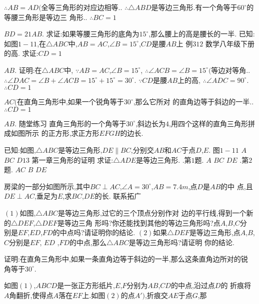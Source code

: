 \documentclass[cn,blue,12pt]{elegantbook}
\begin{document}
\begin{liti}[resume]
\( \therefore AB = AD( \)全等三角形的对应边相等.. 
\( \therefore \triangle ABD \)是等边三角形.有一个角等于\(60 ^\circ \)的等腰三角形是等边三
角形.. 
\( \therefore BC = 1\)
\item \( BD = 21 AB\). 
求证:如果等腰三角形的底角为\( 15 ^\circ \),那么腰上的高是腰长的一半. 
已知:如图\( 1-11\),在\( \triangle ABC \)中,\( AB = AC\),\( \angle  B =15 ^\circ \),\( CD \)是腰\( AB \)上
例\(312\)
数学\(  \)八年级\(  \)下册
的高. 
求证:\( CD = 1\)
\item \( AB\). 
证明:在\( \triangle ABC \)中,
\( \because AB = AC\),\( \angle  B = 15 ^\circ \),
\( \therefore \angle ACB = \angle B = 15 ^\circ ( \)等边对等角.. 
\( \therefore \angle DAC = \angle B + \angle ACB = 15 ^\circ + 15 ^\circ =30 ^\circ \). 
\( \because CD \)是腰\( AB \)上的高,
\( \therefore \angle ADC = 90 ^\circ \). 
\( \therefore CD = 1\)
\item \( AC( \)在直角三角形中,如果一个锐角等于\(30 ^\circ \),那么它所对
的直角边等于斜边的一半.. 
\( \therefore CD = 1\)
\item \( AB\). 
随堂练习
直角三角形的一个角等于\(30 ^\circ \),斜边长为\( 4\),用四个这样的直角三角形拼成如图所示
的正方形,求正方形\( EFGH \)的边长. 
\item 已知:如图,\( \triangle ABC \)是等边三角形,\( DE \parallel BC\),分别交\( AB \)和\( AC \)于点\( D\),\( E\). 
图\( 1-11\)
\(A\)
\(B C\)
\(D13\)
第一章\(  \)三角形的证明
求证:\( \triangle ADE \)是等边三角形. 
.第\( 1 \)题.
\(A\)
\(B C\)
\(D E\)
.第\( 2 \)题.
\(A C\)
\(B\)
\(D E\)
\item 房梁的一部分如图所示,其中\( BC \perp AC\),\( \angle A = 30 ^\circ \),\( AB = 7.4 m\),点\( D \)是\( AB \)的中
点,且\( DE \perp AC\),垂足为\( E\),求\( BC\),\( DE \)的长. 
联系拓广
\item \( ( 1) \)如图,\( \triangle ABC \)是等边三角形,过它的三个顶点分别作对
边的平行线,得到一个新的\( \triangle DEF\),\( \triangle DEF \)是等边三角
形吗?你还能找到其他的等边三角形吗?点\( A\),\( B\),\( C \)分
别是\( EF\),\( ED\),\( FD \)的中点吗?请证明你的结论. 
\(( 2) \)如果\( \triangle DEF \)是等边三角形,点\( A\),\( B\),\( C \)分别是\( EF\),
\(ED\)
,\( FD \)的中点,那么\( \triangle ABC \)是等边三角形吗?请证明
你的结论. 
\item 证明:在直角三角形中,如果一条直角边等于斜边的一半,那么这条直角边所对的锐
角等于\( 30 ^\circ \). 
\item 如图\(( 1)\),\( ABCD \)是一张正方形纸片,\( E\),\( F \)分别为\( AB\),\( CD \)的中点,沿过点\( D \)的
折痕将\( A \)角翻折,使得点\( A \)落在\( EF \)上.如图\(( 2) \)的点\( A′)\),折痕交\( AE \)于点\( G\),那

\end{liti}
\end{document}
